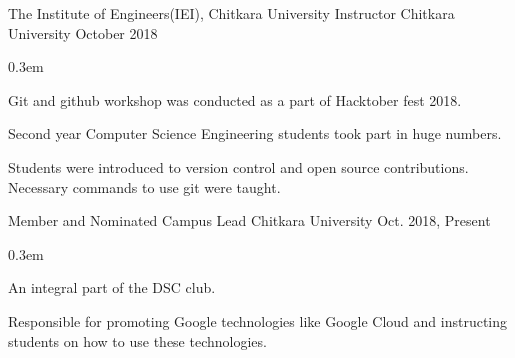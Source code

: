 \vspace{-0.3cm}


\begin{cventries}

  \extraentry
  {The Institute of Engineers(IEI), Chitkara University}
  {Instructor}
  {Chitkara University}
  {October 2018}
  {
    \begin{cvitems}
    \itemsep0.3em
      \item Git and github workshop was conducted as a part of Hacktober fest 2018.
      \item Second year Computer Science Engineering students took part in huge numbers.
      \item Students were introduced to version control and open source contributions. Necessary commands to use git were taught.
    \end{cvitems}
  }

  {Member and Nominated Campus Lead}
  {Chitkara University}
  {Oct. 2018, Present}
  {
    \begin{cvitems}
    \itemsep0.3em
      \item An integral part of the DSC club.
      \item Responsible for promoting Google technologies like Google 
      Cloud and instructing students on how to use these technologies.
    \end{cvitems}
  }

\end{cventries}

